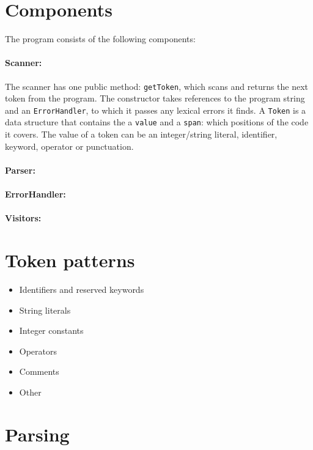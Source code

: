 \documentclass[a4paper]{article}
\newcommand*{\code}[1]{\lstinline{#1}}
\begin{document}
\section{Components}

The program consists of the following components:

\paragraph*{Scanner:} The scanner has one public method: \code{getToken}, 
which scans and returns the next token from the program. The 
constructor takes references to the program string and an 
\code{ErrorHandler}, to which it passes any lexical errors it finds.
A \code{Token} is a data structure that contains the a \code{value} and 
a \code{span}: which positions of the code it covers.
The value of a token can be an integer/string literal, 
identifier, keyword, operator or punctuation.

\paragraph*{Parser:}

\paragraph*{ErrorHandler:}

\paragraph*{Visitors:}

\section{Token patterns}

\begin{itemize}
  \item Identifiers and reserved keywords
  \item String literals
  \item Integer constants
  \item Operators
  \item Comments
  \item Other
\end{itemize}

\section{Parsing}
\end{document}
